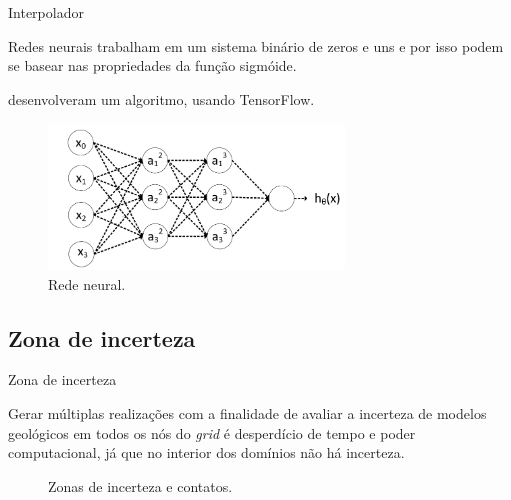 \documentclass[aspectratio=169]{beamer}
\begin{document}
\begin{frame}{Interpolador}

Redes neurais trabalham em um sistema binário de zeros e uns e por isso podem se basear nas propriedades da função sigmóide.

\cite{samson_estimation_ml} desenvolveram um algoritmo, usando TensorFlow.

\begin{figure}[H]
	\caption{\label{nn_ex}Rede neural.}
	\begin{center}
		\includegraphics[width=0.7\textwidth]{capitulo_3/NN_ex.png}
	\end{center}
\end{figure}

\end{frame}

\subsection{Zona de incerteza}

\begin{frame}{Zona de incerteza}

	Gerar múltiplas realizações com a finalidade de avaliar a incerteza de modelos geológicos em todos os nós do \textit{grid} é desperdício de tempo e poder computacional, já que no interior dos domínios não há incerteza. 
	
	\begin{figure}[H] 
		\caption{Zonas de incerteza e contatos.} \label{zonas}
		\centering
		\qquad
	\end{figure}

\end{frame}
\end{document}
